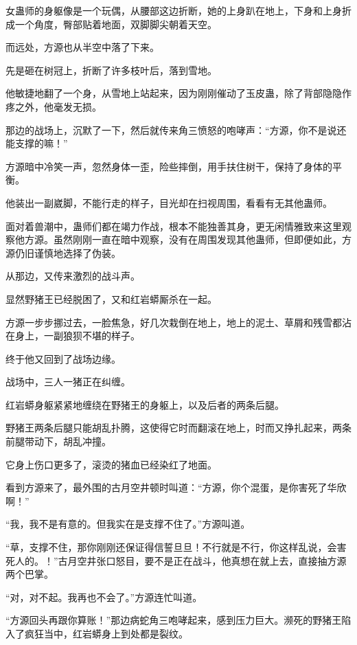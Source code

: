 
\begin{this_body}

女蛊师的身躯像是一个玩偶，从腰部这边折断，她的上身趴在地上，下身和上身折成一个角度，臀部贴着地面，双脚脚尖朝着天空。

而远处，方源也从半空中落了下来。

先是砸在树冠上，折断了许多枝叶后，落到雪地。

他敏捷地翻了一个身，从雪地上站起来，因为刚刚催动了玉皮蛊，除了背部隐隐作疼之外，他毫发无损。

那边的战场上，沉默了一下，然后就传来角三愤怒的咆哮声：“方源，你不是说还能支撑的嘛！”

方源暗中冷笑一声，忽然身体一歪，险些摔倒，用手扶住树干，保持了身体的平衡。

他装出一副崴脚，不能行走的样子，目光却在扫视周围，看看有无其他蛊师。

面对着兽潮中，蛊师们都在竭力作战，根本不能独善其身，更无闲情雅致来这里观察他方源。虽然刚刚一直在暗中观察，没有在周围发现其他蛊师，但即便如此，方源仍旧谨慎地选择了伪装。

从那边，又传来激烈的战斗声。

显然野猪王已经脱困了，又和红岩蟒厮杀在一起。

方源一步步挪过去，一脸焦急，好几次栽倒在地上，地上的泥土、草屑和残雪都沾在身上，一副狼狈不堪的样子。

终于他又回到了战场边缘。

战场中，三人一猪正在纠缠。

红岩蟒身躯紧紧地缠绕在野猪王的身躯上，以及后者的两条后腿。

野猪王两条后腿只能胡乱扑腾，这使得它时而翻滚在地上，时而又挣扎起来，两条前腿带动下，胡乱冲撞。

它身上伤口更多了，滚烫的猪血已经染红了地面。

看到方源来了，最外围的古月空井顿时叫道：“方源，你个混蛋，是你害死了华欣啊！”

“我，我不是有意的。但我实在是支撑不住了。”方源叫道。

“草，支撑不住，那你刚刚还保证得信誓旦旦！不行就是不行，你这样乱说，会害死人的。！”古月空井张口怒目，要不是正在战斗，他真想在就上去，直接抽方源两个巴掌。

“对，对不起。我再也不会了。”方源连忙叫道。

“方源回头再跟你算账！”那边病蛇角三咆哮起来，感到压力巨大。濒死的野猪王陷入了疯狂当中，红岩蟒身上到处都是裂纹。


\end{this_body}
